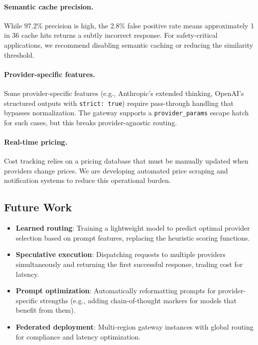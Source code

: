 \documentclass[11pt,twocolumn]{article}
\begin{document}
\paragraph{Semantic cache precision.} While 97.2\% precision is high, the 2.8\% false positive rate means approximately 1 in 36 cache hits returns a subtly incorrect response. For safety-critical applications, we recommend disabling semantic caching or reducing the similarity threshold.

\paragraph{Provider-specific features.} Some provider-specific features (e.g., Anthropic's extended thinking, OpenAI's structured outputs with \texttt{strict: true}) require pass-through handling that bypasses normalization. The gateway supports a \texttt{provider\_params} escape hatch for such cases, but this breaks provider-agnostic routing.

\paragraph{Real-time pricing.} Cost tracking relies on a pricing database that must be manually updated when providers change prices. We are developing automated price scraping and notification systems to reduce this operational burden.

\subsection{Future Work}

\begin{itemize}[leftmargin=*]
    \item \textbf{Learned routing}: Training a lightweight model to predict optimal provider selection based on prompt features, replacing the heuristic scoring functions.
    \item \textbf{Speculative execution}: Dispatching requests to multiple providers simultaneously and returning the first successful response, trading cost for latency.
    \item \textbf{Prompt optimization}: Automatically reformatting prompts for provider-specific strengths (e.g., adding chain-of-thought markers for models that benefit from them).
    \item \textbf{Federated deployment}: Multi-region gateway instances with global routing for compliance and latency optimization.
\end{itemize}
\end{document}
